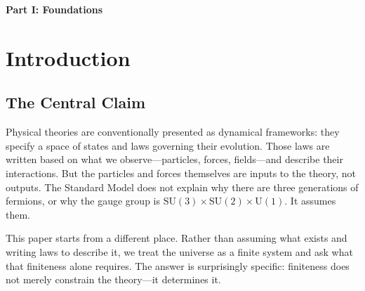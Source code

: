 \documentclass[11pt]{article}
\newcommand{\SU}{\mathrm{SU}}
\newcommand{\U}{\mathrm{U}}
\begin{document}
\begin{abstract}
The derivation chain is: one axiom produces four lemmas (locality, non-closure, irreversibility, minimality), which produce 129 machine-verifiable theorems across 8 physics modules, which produce 25 quantitative predictions (including cosmological densities, the Weinberg angle, all three PMNS neutrino mixing angles, all CKM quark mixing parameters, and six fermion mass ratios), 6 qualitative predictions, and 11 principles normally assumed as axioms---all from zero free parameters (Appendix~F).  The APF codebase (827 assertions, all passing, zero empirical imports in the derivation chain) serves as the authoritative specification: every claim in this paper can be checked against running code.
\end{abstract}

\tableofcontents
\newpage


{\centering\Large\bfseries Part I: Foundations\par}
\vspace{8pt}

\section{Introduction}

\subsection{The Central Claim}

Physical theories are conventionally presented as dynamical frameworks: they specify a space of states and laws governing their evolution.  Those laws are written based on what we observe---particles, forces, fields---and describe their interactions.  But the particles and forces themselves are inputs to the theory, not outputs.  The Standard Model does not explain why there are three generations of fermions, or why the gauge group is $\SU(3)\times\SU(2)\times\U(1)$.  It assumes them.

This paper starts from a different place.  Rather than assuming what exists and writing laws to describe it, we treat the universe as a finite system and ask what that finiteness alone requires.  The answer is surprisingly specific: finiteness does not merely constrain the theory---it determines it.
\end{document}
